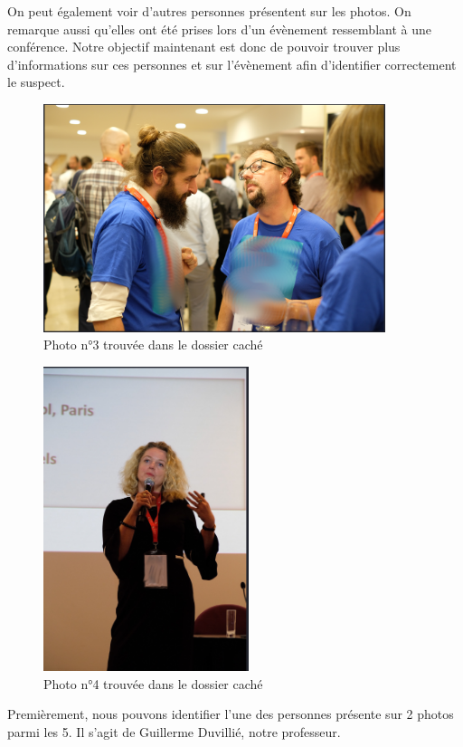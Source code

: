 \documentclass[a4paper]{article}
\begin{document}
On peut également voir d’autres personnes présentent sur les photos. On remarque aussi qu'elles ont été prises lors d’un évènement ressemblant à une conférence.
Notre objectif maintenant est donc de pouvoir trouver plus d’informations sur ces personnes et sur l’évènement afin d’identifier correctement le suspect.

\begin{figure}[H]
    \centering
    \includegraphics[width=10cm]{images/Photo 1 cle usb.png}
    \caption{Photo n°3 trouvée dans le dossier caché}
    \label{third_picture}
\end{figure}

\begin{figure}[H]
    \centering
    \includegraphics[width=6cm]{images/Photo 4 cle usb.png}
    \caption{Photo n°4 trouvée dans le dossier caché}
    \label{fourth_picture}
\end{figure}


Premièrement, nous pouvons identifier l’une des personnes présente sur 2 photos parmi les 5. Il s’agit de Guillerme Duvillié, notre professeur.
\end{document}
